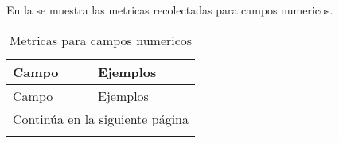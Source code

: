En la  se muestra las metricas recolectadas para campos numericos.

\begin{longtable}{|m{10em}|m{25em}|}
    \caption{Metricas para campos numericos} 
    \label{metricas-numericas} \\
    \hline
    \rowcolor[gray]{0.8}
    Campo & Ejemplos \\
    \hline
    \endfirsthead
    
    \hline
    \rowcolor[gray]{0.8}
    Campo & Ejemplos \\
    \hline
    \endhead
    
    \hline \multicolumn{2}{|r|}{{Continúa en la siguiente página}} \\ \hline
    \endfoot
    
    \hline \hline
    \endlastfoot
    

\end{longtable}
